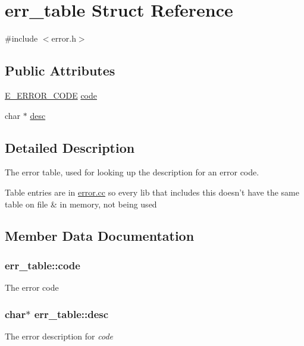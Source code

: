 \section{err\-\_\-table Struct Reference}
\label{structerr__table}


{\ttfamily \#include $<$error.\-h$>$}

\subsection*{Public Attributes}
\begin{DoxyCompactItemize}
\item 
\hyperlink{error_8h_a02135c3838fd11f1cf862ae2daf29e4c}{E\-\_\-\-E\-R\-R\-O\-R\-\_\-\-C\-O\-D\-E} \hyperlink{structerr__table_abd3e59f168d107fb13cb90cf8e87a7c3}{code}
\item 
char $\ast$ \hyperlink{structerr__table_ab14fdebc1cdff8edbeeeb39c23aee399}{desc}
\end{DoxyCompactItemize}


\subsection{Detailed Description}
The error table, used for looking up the description for an error code.

Table entries are in \hyperlink{error_8cc}{error.\-cc} so every lib that includes this doesn't have the same table on file \& in memory, not being used 

\subsection{Member Data Documentation}
\subsubsection[{code}]{ err\-\_\-table\-::code}\label{structerr__table_abd3e59f168d107fb13cb90cf8e87a7c3}
The error code 
\subsubsection[{desc}]{\setlength{\rightskip}{0pt plus 5cm}char$\ast$ err\-\_\-table\-::desc}\label{structerr__table_ab14fdebc1cdff8edbeeeb39c23aee399}
The error description for {\itshape code} 
